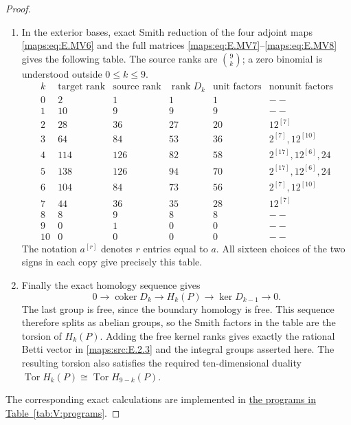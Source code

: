 \documentclass[11pt,a4paper]{article}
\numberwithin{equation}{section}
\theoremstyle{definition}
\begin{document}
\begin{proof}
\begin{enumerate}[label=\arabic*.,leftmargin=*]
\item In the exterior bases, exact Smith reduction of the four
adjoint maps \eqref{maps:eq:E.MV6} and the full matrices
\eqref{maps:eq:E.MV7}--\eqref{maps:eq:E.MV8} gives the following table. The source ranks are $\binom9k$; a zero binomial is
understood outside $0\leq k\leq9$.
\[
 \begin{array}{c|rrrr|l}
 k&\text{target rank}&\text{source rank}&\operatorname{rank}D_k&
       \text{unit factors}&\text{nonunit factors}\\\hline
 0&2&1&1&1&--\\
 1&10&9&9&9&--\\
 2&28&36&27&20&12^{[7]}\\
 3&64&84&53&36&2^{[7]},12^{[10]}\\
 4&114&126&82&58&2^{[17]},12^{[6]},24\\
 5&138&126&94&70&2^{[17]},12^{[6]},24\\
 6&104&84&73&56&2^{[7]},12^{[10]}\\
 7&44&36&35&28&12^{[7]}\\
 8&8&9&8&8&--\\
 9&0&1&0&0&--\\
 10&0&0&0&0&--
 \end{array}
\]
The notation $a^{[r]}$ denotes $r$ entries equal to $a$.
All sixteen choices of the two signs in each copy give precisely
this table.

\item Finally the exact homology sequence gives
\[
 0\longrightarrow\operatorname{coker}D_k
 \longrightarrow H_k(P)
 \longrightarrow\ker D_{k-1}\longrightarrow0.
\]
The last group is free, since the boundary homology is free.
This sequence therefore splits as abelian groups, so the Smith
factors in the table are the torsion of $H_k(P)$.
Adding the free kernel ranks gives exactly the rational Betti
vector in \ref{maps:src:E.2.3} and the integral groups asserted here.
The resulting torsion also satisfies the required ten-dimensional
duality $\operatorname{Tor}H_k(P)\cong
\operatorname{Tor}H_{9-k}(P)$.
\end{enumerate}
The corresponding exact calculations are implemented in \hyperlink{prog:V:shifted-homology}{the programs in Table~\ref*{tab:V:programs}}.
\end{proof}
\end{document}
